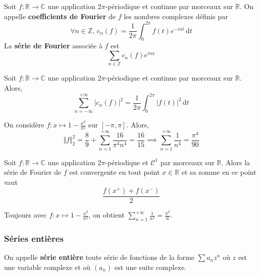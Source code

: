 
  \begin{definition}
    Soit $f : \mathbb{R} \rightarrow \mathbb{C}$ une application $2\pi$-périodique et continue par morceaux sur $\mathbb{R}$. On appelle \textbf{coefficients de Fourier} de $f$ les nombres complexes définis par
    \[ \forall n \in \mathbb{Z}, \, c_n(f) = \frac{1}{2\pi} \int_{0}^{2\pi} f(t) e^{-int} \, \mathrm{d}t \]
    La \textbf{série de Fourier} associée à $f$ est
    \[ \sum_{n \in \mathbb{Z}} c_n(f)e^{inx} \]
  \end{definition}

  \begin{theorem}
    Soit $f : \mathbb{R} \rightarrow \mathbb{C}$ une application $2\pi$-périodique et continue par morceaux sur $\mathbb{R}$. Alors,
    \[ \sum_{n=-\infty}^{+\infty} |c_n(f)|^2 = \frac{1}{2\pi} \int_0^{2\pi} |f(t)|^2 \, \mathrm{d}t \]
  \end{theorem}

  \begin{example}
    On considère $f : x \mapsto 1 - \frac{x^2}{\pi^2}$ sur $[-\pi, \pi]$. Alors,
    \[ \Vert f \Vert^2_2 = \frac{8}{9} + \sum_{n=1}^{+\infty} \frac{16}{\pi^4 n^4} = \frac{16}{15} \implies \sum_{n=1}^{+\infty} \frac{1}{n^4} = \frac{\pi^4}{90} \]
  \end{example}

  \begin{theorem}
    Soit $f : \mathbb{R} \rightarrow \mathbb{C}$ une application $2\pi$-périodique et $\mathcal{C}^1$ par morceaux sur $\mathbb{R}$. Alors la série de Fourier de $f$ est convergente en tout point $x \in \mathbb{R}$ et sa somme en ce point vaut
    \[ \frac{f(x^+) + f(x^-)}{2} \]
  \end{theorem}

  \begin{example}
    Toujours avec $f : x \mapsto 1 - \frac{x^2}{\pi^2}$, on obtient $\sum_{n=1}^{+\infty} \frac{1}{n^2} = \frac{\pi^2}{6}$.
  \end{example}

  \subsubsection{Séries entières}


  \begin{definition}
    On appelle \textbf{série entière} toute série de fonctions de la forme $\sum a_n z^n$ où $z$ est une variable complexe et où $(a_n)$ est une suite complexe.
  \end{definition}

